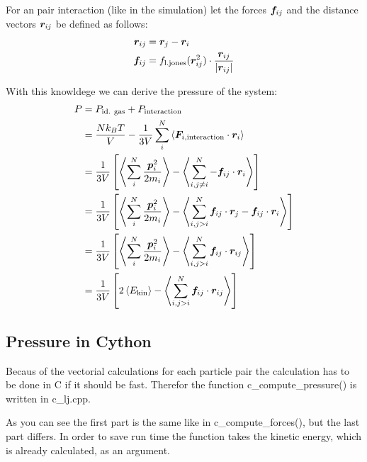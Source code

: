 For an pair interaction (like in the simulation) let the forces $\boldsymbol{f}_{ij}$ and the distance vectors $\boldsymbol{r}_{ij}$ be defined as follows:
\begin{align}
\boldsymbol{r}_{ij}
	&=\boldsymbol{r}_{j} - \boldsymbol{r}_{i}
	\label{4rij}\\
\boldsymbol{f}_{ij} 
	&= f_\text{l.jones}(\boldsymbol{r}_{ij}^2)\cdot\frac{\boldsymbol{r}_{ij}}{\left| \boldsymbol{r}_{ij}\right|}
	\label{4fij}
\end{align}

With this knowldege we can derive the pressure of the system:
\begin{align}
P
	&=P_\text{id. gas} + P_\text{interaction}
	\label{4p4}\\
	&=\frac{Nk_BT}{V} - \frac{1}{3V}\sum_i^N\left\langle\boldsymbol{F}_{i,\text{interaction}}\cdot\boldsymbol{r}_i\right\rangle
	\label{4p5}\\
	&=\frac{1}{3V}\left[\left\langle\sum_i^N\frac{\boldsymbol{p}_i^2}{2m_i}\right\rangle - \left\langle\sum_{i,j\neq i}^N-\boldsymbol{f}_{ij}\cdot\boldsymbol{r}_i\right\rangle\right]
	\label{4p6}\\
	&=\frac{1}{3V}\left[\left\langle\sum_i^N\frac{\boldsymbol{p}_i^2}{2m_i}\right\rangle - \left\langle\sum_{i,j>i}^N\boldsymbol{f}_{ij}\cdot\boldsymbol{r}_{j}-\boldsymbol{f}_{ij}\cdot\boldsymbol{r}_{i}\right\rangle\right]
	\label{4p7}\\
	&=\frac{1}{3V}\left[\left\langle\sum_i^N\frac{\boldsymbol{p}_i^2}{2m_i}\right\rangle - \left\langle\sum_{i,j>i}^N\boldsymbol{f}_{ij}\cdot\boldsymbol{r}_{ij}\right\rangle\right]
	\label{4p8}\\
	&=\frac{1}{3V}\left[ 2\left\langle E_\text{kin}\right\rangle - \left\langle\sum_{i,j>i}^N\boldsymbol{f}_{ij}\cdot\boldsymbol{r}_{ij}\right\rangle\right]
	\label{4p9}
\end{align}

\subsection*{Pressure in Cython}

Becaus of the vectorial calculations for each particle pair the calculation has to be done in C if it should be fast. 
Therefor the function c\_compute\_pressure() is written in c\_lj.cpp.


As you can see the first part is the same like in c\_compute\_forces(), but the last part differs.
In order to save run time the function takes the kinetic energy, which is already calculated, as an argument.
